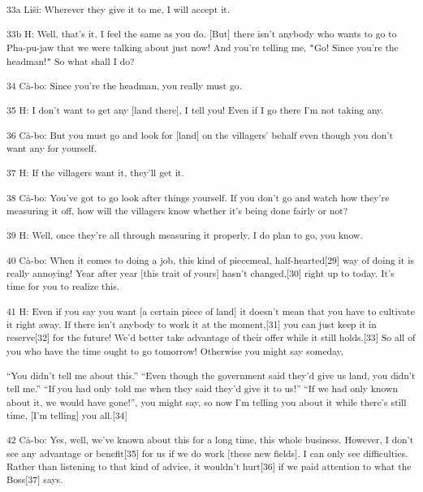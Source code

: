 {\textsuperscript{33a Liši: Wherever they give it to me, I will accept
it.}}

{\textsuperscript{33b H: Well, that's it, I feel the same as you do. [But]
there isn't anybody who wants to go to Pha-pu-jaw that we were talking about just
now! And you're telling me, \texttt{"}Go! Since you're the headman!\texttt{"} So
what shall I do? }}

{\textsuperscript{34 Cà-bo: Since you're the headman, you really must go.}}

{\textsuperscript{35 H: I don't want to get any [land there], I tell you!
Even if I go there I'm not taking any.}}

{\textsuperscript{36 Cà-bo: But you must go and look for [land] on the
villagers' behalf even though you don't want any for yourself. }}

{\textsuperscript{37 H: If the villagers want it, they'll get it. }}

{\textsuperscript{38 Cà-bo: You've got to go look after things yourself.
If you don't go and watch how they're measuring it off, how will the villagers
know whether it's being done fairly or not? }}

{\textsuperscript{39 H: Well, once they're all through measuring it properly,
I do plan to go, you know.}}

{\textsuperscript{40 Cà-bo: When it comes to doing a job, this kind of
piecemeal, half-hearted[29] way of doing it is really annoying! Year after year
[this trait of yours] hasn't changed,[30] right up to today. It's time for you
to realize this. }}

{\textsuperscript{41 H: Even if you say you want [a certain piece of land]
it doesn't mean that you have to cultivate it right away. If there isn't anybody
to work it at the moment,[31] you can just keep it in reserve[32] for the future!
We'd better take advantage of their offer while it still holds.[33] So all of you
who have the time ought to go tomorrow! Otherwise you might say someday,}}

{\textsuperscript{``You didn't tell me about this.'' ``Even though the government
said they'd give us land, you didn't tell me.'' ``If you had only told me when
they said they'd give it to us!'' ``If we had only known about it, we would have
gone!'', you might say, so now I'm telling you about it while there's still time,
[I'm telling] you all.[34]}}

{\textsuperscript{42 Cà-bo: Yes, well, we've known about this for a long
time, this whole business. However, I don't see any advantage or benefit[35] for
us if we do work [these new fields]. I can only see difficulties. Rather than listening
to that kind of advice, it wouldn't hurt[36] if we paid attention to what the Boss[37]
says. }}

